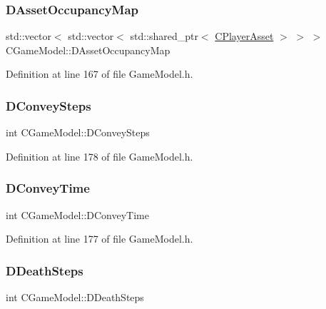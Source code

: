 \subsubsection{\texorpdfstring{D\+Asset\+Occupancy\+Map}{DAssetOccupancyMap}}
{\footnotesize\ttfamily std\+::vector$<$ std\+::vector$<$ std\+::shared\+\_\+ptr$<$ \hyperlink{classCPlayerAsset}{C\+Player\+Asset} $>$ $>$ $>$ C\+Game\+Model\+::\+D\+Asset\+Occupancy\+Map\hspace{0.3cm}{\ttfamily [protected]}}



Definition at line 167 of file Game\+Model.\+h.

\hypertarget{classCGameModel_ad322487a9b50d395fe69c7ad95b71a10}{}\label{classCGameModel_ad322487a9b50d395fe69c7ad95b71a10} 
\subsubsection{\texorpdfstring{D\+Convey\+Steps}{DConveySteps}}
{\footnotesize\ttfamily int C\+Game\+Model\+::\+D\+Convey\+Steps\hspace{0.3cm}{\ttfamily [protected]}}



Definition at line 178 of file Game\+Model.\+h.

\hypertarget{classCGameModel_a4452faa5aa4b062cde343ccd24166232}{}\label{classCGameModel_a4452faa5aa4b062cde343ccd24166232} 
\subsubsection{\texorpdfstring{D\+Convey\+Time}{DConveyTime}}
{\footnotesize\ttfamily int C\+Game\+Model\+::\+D\+Convey\+Time\hspace{0.3cm}{\ttfamily [protected]}}



Definition at line 177 of file Game\+Model.\+h.

\hypertarget{classCGameModel_a8067a8f3737b0f1d6fced523926ce167}{}\label{classCGameModel_a8067a8f3737b0f1d6fced523926ce167} 
\subsubsection{\texorpdfstring{D\+Death\+Steps}{DDeathSteps}}
{\footnotesize\ttfamily int C\+Game\+Model\+::\+D\+Death\+Steps\hspace{0.3cm}{\ttfamily [protected]}}



